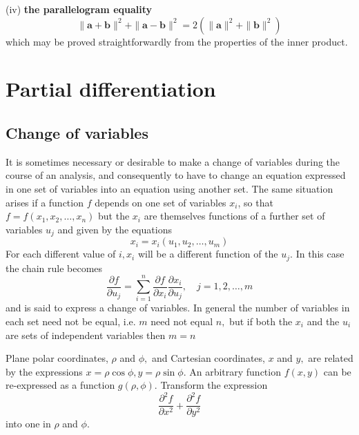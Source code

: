 \documentclass[12pt]{book}
\theoremstyle{definition}\newtheorem{dfn}{Définition}[chapter]
\theoremstyle{plain}\newtheorem{thm}{Théorème}[chapter]
\theoremstyle{plain}\newtheorem{prp}{Proposition}[chapter]
\theoremstyle{plain}\newtheorem{lem}{\bf Lemme}[chapter]
\theoremstyle{plain}\newtheorem{axm}{\bf Axiome}[chapter]
\theoremstyle{plain}\newtheorem{lmm}{\bf Lemme}[chapter]
\theoremstyle{plain}\newtheorem{cor}{\bf Corollaire}[chapter]
\theoremstyle{remark}\newtheorem{rem}{Remarque}[chapter]
\begin{document}
(iv) {\bf the parallelogram equality}
$$
\|\mathbf{a}+\mathbf{b}\|^{2}+\|\mathbf{a}-\mathbf{b}\|^{2}=2\left(\|\mathbf{a}\|^{2}+\|\mathbf{b}\|^{2}\right)
$$
which may be proved straightforwardly from the properties of the inner product.
\section{Partial differentiation}
\subsection{Change of variables}
It is sometimes necessary or desirable to make a change of variables during the course of an analysis, and consequently to have to change an equation expressed in one set of variables into an equation using another set. The same situation arises if a function $f$ depends on one set of variables $x_{i}$, so that $f=f\left(x_{1}, x_{2}, \ldots, x_{n}\right)$ but the $x_{i}$ are themselves functions of a further set of variables $u_{j}$ and given by the equations
$$
x_{i}=x_{i}\left(u_{1}, u_{2}, \ldots, u_{m}\right)
$$
For each different value of $i, x_{i}$ will be a different function of the $u_{j} .$ In this case the chain rule becomes
\begin{equation}
\frac{\partial f}{\partial u_{j}}=\sum_{i=1}^{n} \frac{\partial f}{\partial x_{i}} \frac{\partial x_{i}}{\partial u_{j}}, \quad j=1,2, \ldots, m\label{14}
\end{equation}and is said to express a change of variables. In general the number of variables in each set need not be equal, i.e. $m$ need not equal $n,$ but if both the $x_{i}$ and the $u_{i}$ are sets of independent variables then $m=n$

Plane polar coordinates, $\rho$ and $\phi,$ and Cartesian coordinates, $x$ and $y,$ are related by the expressions $x=\rho \cos \phi,y=\rho \sin \phi$. An arbitrary function $f(x, y)$ can be re-expressed as a function $g(\rho, \phi) .$ Transform the expression
$$
\frac{\partial^{2} f}{\partial x^{2}}+\frac{\partial^{2} f}{\partial y^{2}}
$$
into one in $\rho$ and $\phi$.
\end{document}
